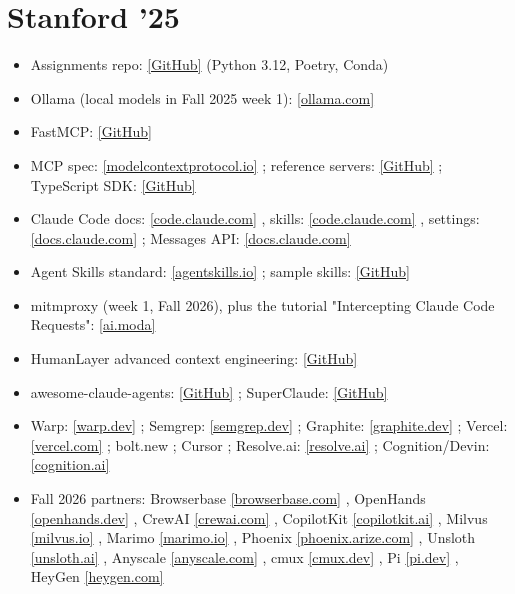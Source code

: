 \documentclass[10pt,oneside]{report}
\begin{document}
\section{Stanford '25}
{\small\begin{itemize}
\item Assignments repo: \href{https://github.com/mihail911/modern-software-dev-assignments}{[GitHub]} (Python 3.12, Poetry, Conda)
\item Ollama (local models in Fall 2025 week 1): \href{https://ollama.com}{[ollama.com]}
\item FastMCP: \href{https://github.com/jlowin/fastmcp}{[GitHub]}
\item MCP spec: \href{https://modelcontextprotocol.io/}{[modelcontextprotocol.io]} ; reference servers: \href{https://github.com/modelcontextprotocol/servers}{[GitHub]} ; TypeScript SDK: \href{https://github.com/modelcontextprotocol/typescript-sdk}{[GitHub]}
\item Claude Code docs: \href{https://code.claude.com/docs/en/setup}{[code.claude.com]} , skills: \href{https://code.claude.com/docs/en/skills}{[code.claude.com]} , settings: \href{https://docs.claude.com/en/docs/claude-code/settings}{[docs.claude.com]} ; Messages API: \href{https://docs.claude.com/en/api/messages}{[docs.claude.com]}
\item Agent Skills standard: \href{https://agentskills.io}{[agentskills.io]} ; sample skills: \href{https://github.com/mattpocock/skills}{[GitHub]}
\item mitmproxy (week 1, Fall 2026), plus the tutorial "Intercepting Claude Code Requests": \href{https://www.ai.moda/en/blog/tutorial-intercepting-claude-code-requests}{[ai.moda]}
\item HumanLayer advanced context engineering: \href{https://github.com/humanlayer/advanced-context-engineering-for-coding-agents}{[GitHub]}
\item awesome-claude-agents: \href{https://github.com/vijaythecoder/awesome-claude-agents}{[GitHub]} ; SuperClaude: \href{https://github.com/SuperClaude-Org/SuperClaude_Framework}{[GitHub]}
\item Warp: \href{https://www.warp.dev/}{[warp.dev]} ; Semgrep: \href{https://semgrep.dev/}{[semgrep.dev]} ; Graphite: \href{https://graphite.dev/}{[graphite.dev]} ; Vercel: \href{https://vercel.com/}{[vercel.com]} ; bolt.new ; Cursor ; Resolve.ai: \href{https://resolve.ai/}{[resolve.ai]} ; Cognition/Devin: \href{https://cognition.ai/}{[cognition.ai]}
\item Fall 2026 partners: Browserbase \href{https://www.browserbase.com}{[browserbase.com]} , OpenHands \href{https://www.openhands.dev}{[openhands.dev]} , CrewAI \href{https://www.crewai.com}{[crewai.com]} , CopilotKit \href{https://www.copilotkit.ai}{[copilotkit.ai]} , Milvus \href{https://milvus.io}{[milvus.io]} , Marimo \href{https://marimo.io}{[marimo.io]} , Phoenix \href{https://phoenix.arize.com}{[phoenix.arize.com]} , Unsloth \href{https://unsloth.ai}{[unsloth.ai]} , Anyscale \href{https://www.anyscale.com}{[anyscale.com]} , cmux \href{https://cmux.dev}{[cmux.dev]} , Pi \href{https://pi.dev}{[pi.dev]} , HeyGen \href{https://www.heygen.com}{[heygen.com]}
\end{itemize}}
\end{document}
